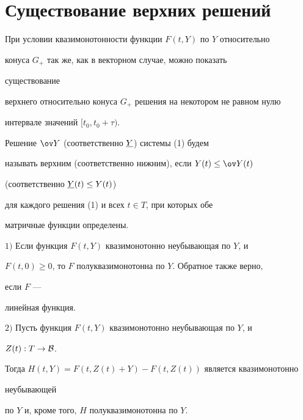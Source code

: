  


\section{Существование верхних решений} 


 


При условии квазимонотонности функции $F(t,Y)$ по $Y$ относительно 


конуса $G_+$ так же, как в векторном случае, можно показать 


существование 


верхнего относительно конуса $G_+$ решения на некотором не равном нулю 


интервале значений $[t_0,t_0+\tau)$. 


 


\begin{defn} 


Решение $\ov Y$ (соответственно $\underline Y$) системы (1) будем 


называть верхним (соответственно нижним), если $Y(t)\le\ov Y(t)$ 


(соответственно $\underline Y(t)\le Y(t)$) 


для каждого решения (1) и всех $t\in T$, при которых обе 


матричные функции определены. 


\end{defn} 


 


\begin{lem} 


$1)$ Если функция $F(t,Y)$ квазимонотонно неубывающая по $Y$, и 


$F(t,0)\ge0$, то $F$ полуквазимонотонна по $Y$. Обратное также верно, 


если $F$ --- 


линейная функция. 


 


$2)$ Пусть функция $F(t,Y)$ квазимонотонно неубывающая по $Y$, и 


$Z(t):T\to\cal B$. 


Тогда $H(t,Y)=F(t,Z(t)+Y)-F(t,Z(t))$ является квазимонотонно 


неубывающей 


по $Y$ и, кроме того, $H$ полуквазимонотонна по $Y$. 


\end{lem} 


